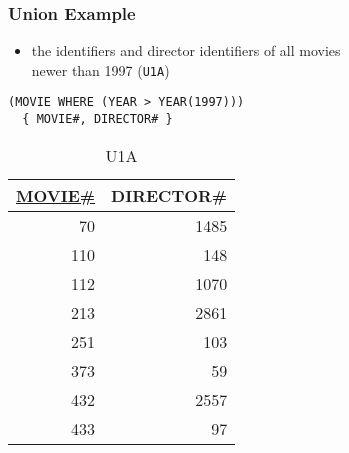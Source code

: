 \documentclass[dvipsnames]{beamer}
\theoremstyle{plain}
\begin{document}
\begin{frame}[fragile]
  \frametitle{Union Example}

  \begin{example}
    \begin{itemize}
      \item the identifiers and director identifiers of all movies\\
        newer than 1997 (\texttt{U1A})
    \end{itemize}

    \begin{lstlisting}
(MOVIE WHERE (YEAR > YEAR(1997)))
  { MOVIE#, DIRECTOR# }
    \end{lstlisting}

    \pause
    \vspace{-10pt}
    \begin{tiny}
    \begin{table}
      \caption{U1A}
      \begin{tabular}{|r|r|}\hline
\underline{MOVIE\#} & DIRECTOR\#\\[2pt]\hline\hline
 70 &       1485\\\hline
110 &        148\\\hline
112 &       1070\\\hline
213 &       2861\\\hline
251 &        103\\\hline
373 &         59\\\hline
432 &       2557\\\hline
433 &         97\\\hline
      \end{tabular}
    \end{table}
    \end{tiny}
  \end{example}
\end{frame}
\end{document}
